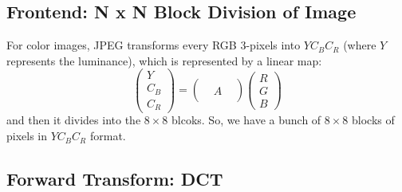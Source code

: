 \documentclass{article}
\begin{document}
  \subsection{Frontend: N x N Block Division of Image}

    For color images, JPEG transforms every RGB 3-pixels into $Y C_B C_R$ (where $Y$ represents the luminance), which is represented by a linear map: 
    \[\begin{pmatrix} Y  \\ C_B \\ C_R \end{pmatrix} = \begin{pmatrix} & & \\ & A & \\ & & \end{pmatrix} \begin{pmatrix} R \\ G \\ B \end{pmatrix} \]
    and then it divides into the $8 \times 8$ blcoks. So, we have a bunch of $8 \times 8$ blocks of pixels in $Y C_B C_R$ format. 

  \subsection{Forward Transform: DCT}
\end{document}
